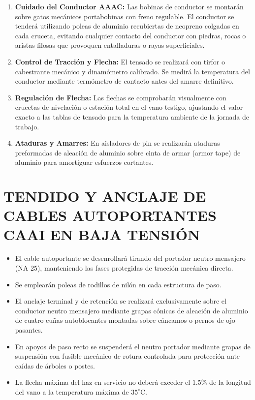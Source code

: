 \begin{enumerate}
  \item \textbf{Cuidado del Conductor AAAC:} Las bobinas de conductor se montarán sobre gatos mecánicos portabobinas con freno regulable. El conductor se tenderá utilizando poleas de aluminio recubiertas de neopreno colgadas en cada cruceta, evitando cualquier contacto del conductor con piedras, rocas o aristas filosas que provoquen entalladuras o rayas superficiales.
  \item \textbf{Control de Tracción y Flecha:} El tensado se realizará con tirfor o cabestrante mecánico y dinamómetro calibrado. Se medirá la temperatura del conductor mediante termómetro de contacto antes del amarre definitivo.
  \item \textbf{Regulación de Flecha:} Las flechas se comprobarán visualmente con crucetas de nivelación o estación total en el vano testigo, ajustando el valor exacto a las tablas de tensado para la temperatura ambiente de la jornada de trabajo.
  \item \textbf{Ataduras y Amarres:} En aisladores de pin se realizarán ataduras preformadas de aleación de aluminio sobre cinta de armar (armor tape) de aluminio para amortiguar esfuerzos cortantes.
\end{enumerate}

\section{TENDIDO Y ANCLAJE DE CABLES AUTOPORTANTES CAAI EN BAJA TENSIÓN}

\begin{itemize}
  \item El cable autoportante se desenrollará tirando del portador neutro mensajero (NA 25), manteniendo las fases protegidas de tracción mecánica directa.
  \item Se emplearán poleas de rodillos de nilón en cada estructura de paso.
  \item El anclaje terminal y de retención se realizará exclusivamente sobre el conductor neutro mensajero mediante grapas cónicas de aleación de aluminio de cuatro cuñas autoblocantes montadas sobre cáncamos o pernos de ojo pasantes.
  \item En apoyos de paso recto se suspenderá el neutro portador mediante grapas de suspensión con fusible mecánico de rotura controlada para protección ante caídas de árboles o postes.
  \item La flecha máxima del haz en servicio no deberá exceder el $1.5\%$ de la longitud del vano a la temperatura máxima de $35^\circ\text{C}$.
\end{itemize}

